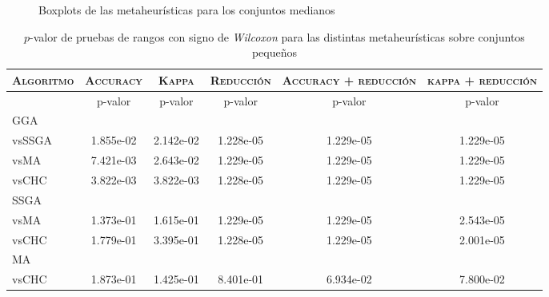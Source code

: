 \begin{figure}[h!]

	\centering

\caption{Boxplots de las metaheurísticas para los conjuntos medianos}
\label{medium-heuristics}
\end{figure}


\begin{table}[h!]
\centering
\begin{adjustbox}{max width =\textwidth}
\begin{tabular}{l c c c c c}
\hline
	\textsc{Algoritmo}
	& \multicolumn{1}{c}{\textsc{Accuracy}}
	& \multicolumn{1}{c}{\textsc{Kappa}}
	& \multicolumn{1}{c}{\textsc{Reducción}} 
	& \multicolumn{1}{c}{\textsc{Accuracy + reducción}} 
	& \multicolumn{1}{c}{\textsc{kappa + reducción}} \\
\hline
\hline

 & p-valor & p-valor & p-valor & p-valor & p-valor \\

GGA \\
vsSSGA & 1.855e-02 & 2.142e-02 & 1.228e-05 & 1.229e-05 & 1.229e-05 \\
vsMA & 7.421e-03 & 2.643e-02 & 1.229e-05 & 1.229e-05 & 1.229e-05 \\
vsCHC & 3.822e-03 & 3.822e-03 & 1.228e-05 & 1.229e-05 & 1.229e-05 \\

\hline

SSGA \\
vsMA & 1.373e-01 & 1.615e-01 & 1.229e-05 & 1.229e-05 & 2.543e-05 \\
vsCHC & 1.779e-01 & 3.395e-01 & 1.228e-05 & 1.229e-05 & 2.001e-05 \\

\hline

MA \\
vsCHC & 1.873e-01 & 1.425e-01 & 8.401e-01 & 6.934e-02 & 7.800e-02 \\ 

\hline

\end{tabular}
\end{adjustbox}
\caption[Pruebas de \emph{Wilcoxon} entre las metaheurísticas para conjuntos pequeños]{$p$-valor de pruebas de rangos con signo de \emph{Wilcoxon} para las distintas metaheurísticas sobre conjuntos pequeños}
\label{wilcox-meta-peq}
\end{table}

